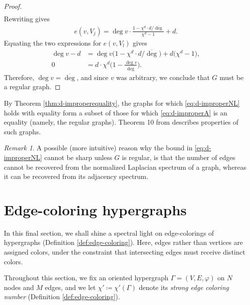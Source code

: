 \documentclass{article}
\theoremstyle{plain}
\theoremstyle{definition}
\theoremstyle{remark}
\newtheorem{remark}[theorem]{Remark}
\begin{document}
\begin{proof}
\begin{align*}
    \end{align*}
    Rewriting gives
    \begin{align*}
        e(v,V_j) = \deg v \cdot \frac{1-\chi^d\cdot d/\overline{\deg}}{\chi^d-1} + d.
    \end{align*}
    Equating the two expressions for $e(v,V_l)$ gives
    \begin{align*}
        \deg v - d &= \deg v\bigl(1-\chi^d\cdot d/\overline{\deg}\bigr) + d\bigl(\chi^d-1\bigr),\\
        0&= d\cdot \chi^d\biggl(1-\frac{\deg v}{\overline \deg}\biggr).
    \end{align*}
    Therefore, $\deg v = \overline{\deg}$, and since $v$ was arbitrary, we conclude that $G$ must be a regular graph.
\end{proof}
By Theorem \ref{thm:d-improperequality}, the graphs for which \eqref{eq:d-improperNL} holds with equality form a subset of those for which \eqref{eq:d-improperA} is an equality (namely, the regular graphs). Theorem 10 from \cite{guo2024spectral} describes properties of such graphs.
\begin{remark}
    A possible (more intuitive) reason why the bound in \eqref{eq:d-improperNL} cannot be sharp unless $G$ is regular, is that the number of edges cannot be recovered from the normalized Laplacian spectrum of a graph, whereas it can be recovered from its adjacency spectrum. 
\end{remark}


\section{Edge-coloring hypergraphs}\label{sec:edgecol}




In this final section, we shall shine a spectral light on edge-colorings of hypergraphs (Definition \ref{def:edge-coloring}). Here, edges rather than vertices are assigned colors, under the constraint that intersecting edges must receive distinct colors. \newline

Throughout this section, we fix an oriented hypergraph $\Gamma=(V,E,\varphi)$ on $N$ nodes and $M$ edges, and we let $\chi'\coloneqq \chi'(\Gamma)$ denote its 
\emph{strong edge coloring number} (Definition \ref{def:edge-coloring}).\newline 
\end{document}
